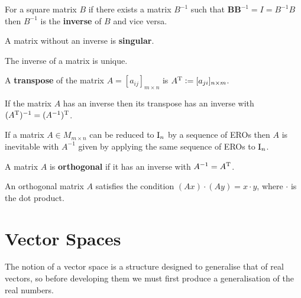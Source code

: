 \begin{definition}[Inverse]
    For a square matrix $B$ if there exists a matrix $B^{-1}$ such that $\textbf{BB}^{-1} = I = B^{-1}B$ then $B^{-1}$ is the \textbf{inverse} of $B$ and vice versa.
\end{definition}

\begin{definition}[Singular]
    A matrix without an inverse is \textbf{singular}.
\end{definition}

\begin{theorem}
    The inverse of a matrix is unique.
\end{theorem}

\begin{definition}
    A \textbf{transpose} of the matrix $A = [a_{ij}]_{m\times n}$ is  $A^{\mathrm{T}} := [a_{ji}]_{n\times m}$.
\end{definition}

\begin{theorem}
    If the matrix $A$ has an inverse then its transpose has an inverse with $(A^{\mathrm{T}})^{-1}=(A^{-1})^{\mathrm{T}}$.
\end{theorem}

\begin{theorem}
    If a matrix $A\in M_{m\times n}$ can be reduced to $\mathrm{I}_n$ by a sequence of EROs then $A$ is inevitable with $A^{-1}$ given by applying the same sequence of EROs to $\mathrm{I}_n$.
\end{theorem}

\begin{definition}
    A matrix $A$ is \textbf{orthogonal} if it has an inverse with $A^{-1}=A^{\mathrm{T}}$.
\end{definition}

\begin{theorem}
    An orthogonal matrix $A$ satisfies the condition $(Ax) \cdot (Ay) = x \cdot y$, where $\cdot$ is the dot product.
\end{theorem}

\section{Vector Spaces}
The notion of a vector space is a structure designed to generalise that of real vectors, so before developing them we must first produce a generalisation of the real numbers.
